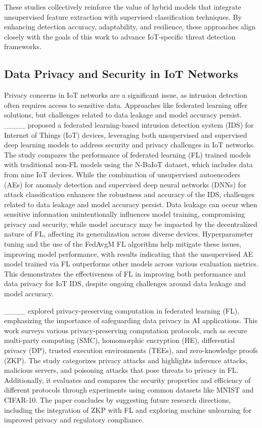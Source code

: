 These studies collectively reinforce the value of hybrid models that integrate unsupervised feature extraction with supervised classification techniques. By enhancing detection accuracy, adaptability, and resilience, these approaches align closely with the goals of this work to advance IoT-specific threat detection frameworks.
\subsection{Data Privacy and Security in IoT Networks}

Privacy concerns in IoT networks are a significant issue, as intrusion detection often requires access to sensitive data. Approaches like federated learning offer solutions, but challenges related to data leakage and model accuracy persist. ____ proposed a federated learning-based intrusion detection system (IDS) for Internet of Things (IoT) devices, leveraging both unsupervised and supervised deep learning models to address security and privacy challenges in IoT networks. The study compares the performance of federated learning (FL) trained models with traditional non-FL models using the N-BaIoT dataset, which includes data from nine IoT devices. While the combination of unsupervised autoencoders (AEs) for anomaly detection and supervised deep neural networks (DNNs) for attack classification enhances the robustness and accuracy of the IDS, challenges related to data leakage and model accuracy persist. Data leakage can occur when sensitive information unintentionally influences model training, compromising privacy and security, while model accuracy may be impacted by the decentralized nature of FL, affecting its generalization across diverse devices. Hyperparameter tuning and the use of the FedAvgM FL algorithm help mitigate these issues, improving model performance, with results indicating that the unsupervised AE model trained via FL outperforms other models across various evaluation metrics. This demonstrates the effectiveness of FL in improving both performance and data privacy for IoT IDS, despite ongoing challenges around data leakage and model accuracy.

____ explored privacy-preserving computation in federated learning (FL), emphasizing the importance of safeguarding data privacy in AI applications. This work surveys various privacy-preserving computation protocols, such as secure multi-party computing (SMC), homomorphic encryption (HE), differential privacy (DP), trusted execution environments (TEEs), and zero-knowledge proofs (ZKP). The study categorizes privacy attacks and highlights inference attacks, malicious servers, and poisoning attacks that pose threats to privacy in FL. Additionally, it evaluates and compares the security properties and efficiency of different protocols through experiments using common datasets like MNIST and CIFAR-10. The paper concludes by suggesting future research directions, including the integration of ZKP with FL and exploring machine unlearning for improved privacy and regulatory compliance.

